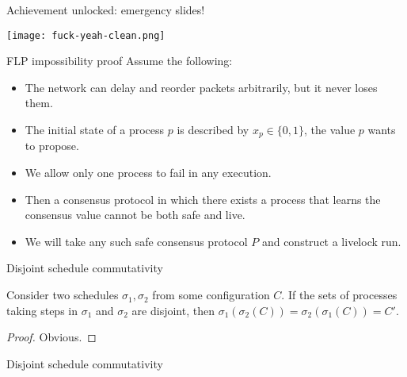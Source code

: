 \documentclass{beamer}
\begin{document}
\begin{frame}{Achievement unlocked: emergency slides!}
  \begin{center}
    \texttt{[image: fuck-yeah-clean.png]}
  \end{center}
\end{frame}

\begin{frame}{FLP impossibility proof}
Assume the following:
  \begin{itemize}
    \item The network can delay and reorder packets arbitrarily, but it never loses them.
    \item The initial state of a process $p$ is described by $x_p \in \{ 0, 1 \}$, the value $p$ wants to propose.
    \item We allow only one process to fail in any execution.
    \item Then a consensus protocol in which there \alert{exists} a process that learns the consensus value cannot be both safe and live.
    \item We will take any such safe consensus protocol $P$ and construct a livelock run.
  \end{itemize}
\end{frame}

\begin{frame}{Disjoint schedule commutativity}
  \begin{lemma}
    Consider two schedules $\sigma_1, \sigma_2$ from some configuration $C$. If the sets of processes taking steps in $\sigma_1$ and $\sigma_2$ are disjoint, then $\sigma_1(\sigma_2(C)) = \sigma_2(\sigma_1(C)) = C'$.
  \end{lemma}
  \begin{proof}
    Obvious.
  \end{proof}
\end{frame}

\begin{frame}{Disjoint schedule commutativity}
  \begin{figure}[!h]
  \centering
  \end{figure}
\end{frame}
\end{document}
